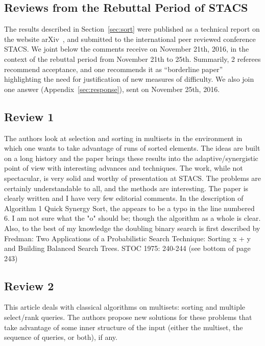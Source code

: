 \begin{appendices}

  \section{Reviews from the Rebuttal Period of STACS}

  The results described in Section~\ref{sec:sort} were published as a
  technical report on the website
  arXiv~\cite{2016-ARXIV-SynergisticSortingAndDeferredDataStructuresOnMultiSets-BarbayOchoaSatty},
  and submitted to the international peer reviewed conference
  STACS. We joint below the comments receive on November 21th, 2016,
  in the context of the rebuttal period from November 21th to
  25th. Summarily, 2 referees recommend acceptance, and one
  recommends it as ``borderline paper'' highlighting the need for
  justification of new measures of difficulty. We also join one
  answer (Appendix~\ref{sec:response}), sent on November 25th, 2016.  

  \subsection{Review 1}

  The authors look at selection and sorting in multisets in the
  environment in which one wants to take advantage of runs of sorted
  elements. The ideas are built on a long history and the paper brings
  these results into the adaptive/synergistic point of view with
  interesting advances and techniques.  The work, while not
  spectacular, is very solid and worthy of presentation at STACS. The
  problems are certainly understandable to all, and the methods are
  interesting.  The paper is clearly written and I have very few
  editorial comments.  In the description of Algorithm 1 Quick Synergy
  Sort, the appears to be a typo in the line numbered 6. I am not sure
  what the "o" should be; though the algorithm as a whole is clear.
  Also, to the best of my knowledge the doubling binary search is
  first described by Fredman: Two Applications of a Probabilistic
  Search Technique: Sorting x + y and Building Balanced Search
  Trees. STOC 1975: 240-244 (see bottom of page 243)

  \subsection{Review 2}

  This article deals with classical algorithms on multisets: sorting
  and multiple select/rank queries. The authors propose new solutions
  for these problems that take advantage of some inner structure of
  the input (either the multiset, the sequence of queries, or both),
  if any.


\end{appendices}
